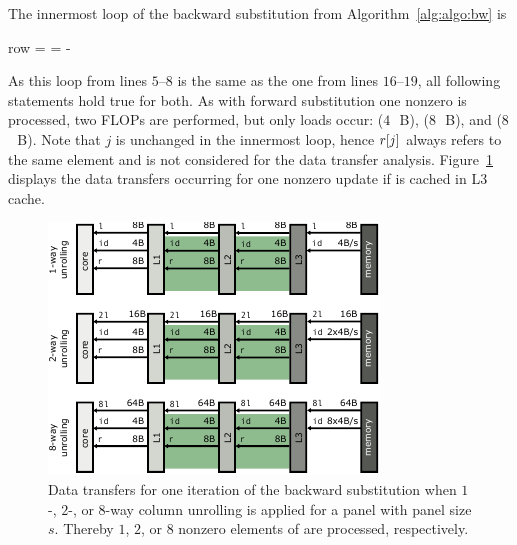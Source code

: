 The innermost loop of the backward substitution from
Algorithm~\ref{alg:algo:bw} is %
%
\begin{algorithmic}[1]
\setcounter{ALG@line}{4}
    \State row = \nindx[i++]
    \State \nr[j] = \nr[j] - \nr[row] \nlnz[k]
  \EndFor
\end{algorithmic}%
\noindent%
%
As this loop from lines $5$--$8$ is the same as the one from lines $16$--$19$,
all following statements hold true for both. 
%
As with forward substitution one nonzero is processed, two FLOPs are performed,
but only loads occur: \vindx{} ($4$~\,B), \vr{} ($8$~\,B), and \vlnz{} ($8$~\,B).
Note that $j$ is unchanged in the innermost loop, hence $r[j]$ always refers
to the same element and is not considered for the data transfer analysis.
%
Figure~\ref{fig:ecm:data-bw} displays the data transfers occurring for one
nonzero update if \vr{} is cached in L3 cache.

\begin{figure}[t]
  \centering%
  \includegraphics[width=0.75\linewidth,clip=true]{images/ecm-datatransfers-bw}
  \caption{Data transfers for one iteration of the backward
    substitution when $1$-, $2$-, or $8$-way column unrolling is applied
    for a panel with panel size $s$.
    Thereby $1$, $2$, or $8$ nonzero elements of \vlnz{} are processed,
    respectively.
  }
  \label{fig:ecm:data-bw}
\end{figure}

